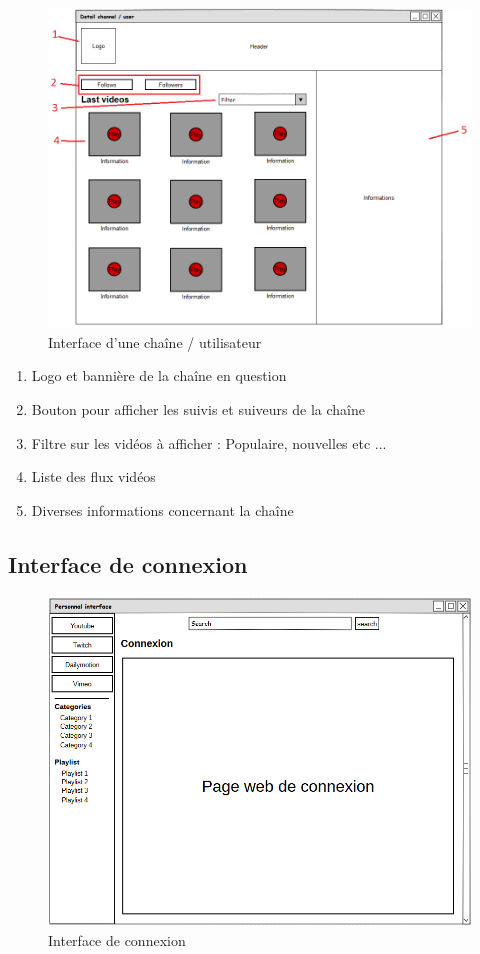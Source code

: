 \documentclass[11pt]{report} %
\begin{document}
		\begin{figure}[h]
			\center
			\includegraphics[width=1\textwidth]{../img/channelInterfacenum.png}
			\caption{Interface d'une chaîne / utilisateur}
			\label{interfacechannel}
		\end{figure}
		
		\begin{enumerate}
			\item Logo et bannière de la chaîne en question
			\item Bouton pour afficher les suivis et suiveurs de la chaîne
			\item Filtre sur les vidéos à afficher : Populaire, nouvelles etc ...
			\item Liste des flux vidéos
			\item Diverses informations concernant la chaîne
		\end{enumerate}
		\newpage
		\subsection{Interface de connexion}
		\begin{figure}[h]
			\center
			\includegraphics[width=1\textwidth]{../img/connexionInterface.png}
			\caption{Interface de connexion}
			\label{interfacechannel}
		\end{figure}
		
\end{document}
